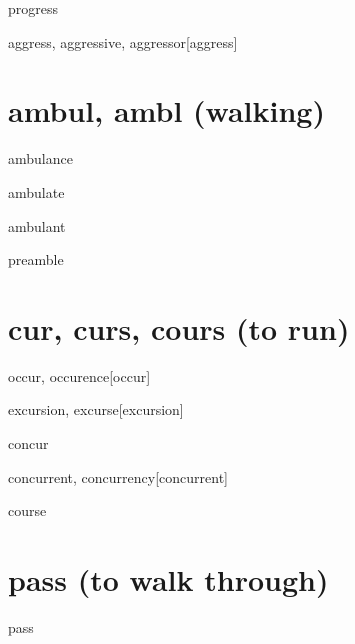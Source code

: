 \begin{RefWord}{progress}
\end{RefWord}

\begin{RefWord}{aggress, aggressive, aggressor}[aggress]
\end{RefWord}

\section{ambul, ambl (walking)}
\begin{RefWord}{ambulance}
\end{RefWord}

\begin{RefWord}{ambulate}
\end{RefWord}

\begin{RefWord}{ambulant}
\end{RefWord}

\begin{RefWord}{preamble}
\end{RefWord}

\section{cur, curs, cours (to run)}

\begin{RefWord}{occur, occurence}[occur]
\end{RefWord}

\begin{RefWord}{excursion, excurse}[excursion]
\end{RefWord}


\begin{RefWord}{concur}
    
\end{RefWord}

\begin{RefWord}{concurrent, concurrency}[concurrent]
\end{RefWord}

\begin{RefWord}{course}
\end{RefWord}

\section{pass (to walk through)}

\begin{RefWord}{pass}
\end{RefWord}

